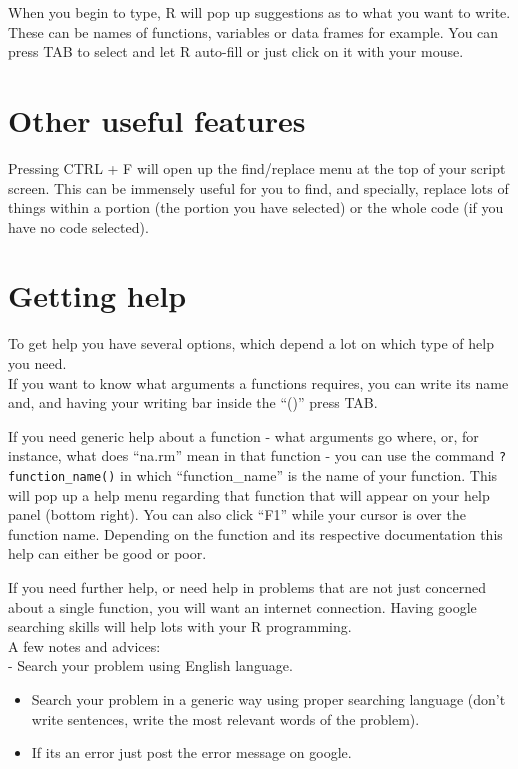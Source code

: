 \documentclass[
]{book}
\begin{document}
When you begin to type, R will pop up suggestions as to what you want to write.
These can be names of functions, variables or data frames for example.
You can press TAB to select and let R auto-fill or just click on it with your mouse.

\hypertarget{other-useful-features}{%
\section{Other useful features}\label{other-useful-features}}

Pressing CTRL + F will open up the find/replace menu at the top of your script screen.
This can be immensely useful for you to find, and specially, replace lots of things within a portion (the portion you have selected) or the whole code (if you have no code selected).

\hypertarget{getting-help}{%
\section{Getting help}\label{getting-help}}

To get help you have several options, which depend a lot on which type of help you need.\\

If you want to know what arguments a functions requires, you can write its name and, and having your writing bar inside the ``()'' press TAB.

If you need generic help about a function - what arguments go where, or, for instance, what does ``na.rm'' mean in that function - you can use the command \texttt{?function\_name()} in which ``function\_name'' is the name of your function.
This will pop up a help menu regarding that function that will appear on your help panel (bottom right).
You can also click ``F1'' while your cursor is over the function name.
Depending on the function and its respective documentation this help can either be good or poor.

If you need further help, or need help in problems that are not just concerned about a single function, you will want an internet connection.
Having google searching skills will help lots with your R programming.\\

A few notes and advices:\\
- Search your problem using English language.\\

\begin{itemize}
\item
  Search your problem in a generic way using proper searching language (don't write sentences, write the most relevant words of the problem).\\
\item
  If its an error just post the error message on google.\\
\end{itemize}
\end{document}

